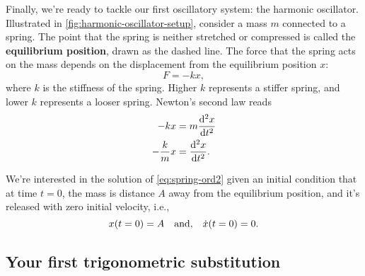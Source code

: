 Finally, we're ready to tackle our first oscillatory system: the harmonic oscillator. Illustrated in \cref{fig:harmonic-oscillator-setup}, consider a mass $m$ connected to a spring. The point that the spring is neither stretched or compressed is called the \textbf{equilibrium position}, drawn as the dashed line. The force that the spring acts on the mass depends on the displacement from the equilibrium position $x$:
\begin{equation}
	F = -kx,
\end{equation}
where $k$ is the stiffness of the spring. Higher $k$ represents a stiffer spring, and lower $k$ represents a looser spring. Newton's second law reads
\begin{align}
	-kx &= m\odv[ord = 2]{x}{t} \\
	-\frac{k}{m}x &= \odv[ord = 2]{x}{t}. \label{eq:spring-ord2}
\end{align}

We're interested in the solution of \cref{eq:spring-ord2} given an initial condition that at time $t = 0$, the mass is distance $A$ away from the equilibrium position, and it's released with zero initial velocity, i.e.,
\begin{equation}
	x(t = 0) = A \quad\textrm{and,}\quad \dot{x}(t = 0) = 0. \label{eq:spring-initial-condition}
\end{equation}

\subsection{Your first trigonometric substitution}

